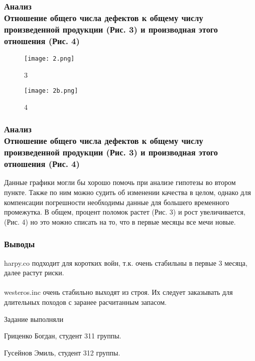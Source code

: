 \documentclass[8pt]{beamer}
\begin{document}
\begin{frame}
\frametitle{Анализ\\ {\small Отношение общего числа дефектов к общему числу произведенной продукции (Рис. 3) и производная этого отношения (Рис. 4)}}
\begin{figure}[h]
		\texttt{[image: 2.png]}
		\caption{3}
		\label{Third}
\end{figure}

\begin{figure}[h]
		\texttt{[image: 2b.png]}
		\caption{4}
		\label{Fourth}
\end{figure}

\end{frame}

\begin{frame}
\frametitle{Анализ\\ {\small Отношение общего числа дефектов к общему числу произведенной продукции (Рис. 3) и производная этого отношения (Рис. 4)}}
Данные графики могли бы хорошо помочь при анализе гипотезы во втором пункте. Также по ним можно судить об изменении качества в целом, однако для компенсации погрешности необходимы данные для большего временного промежутка. В общем, процент поломок растет (Рис. 3) и рост увеличивается, (Рис. 4) но это можно списать на то, что в первые месяцы все мечи новые.
\end{frame}


\begin{frame}
\frametitle{Выводы}
harpy.co подходит для коротких войн, т.к. очень стабильны в первые 3 месяца, \\далее растут риски.\\
~\\
westeros.inc очень стабильно выходят из строя. Их следует заказывать для длительных походов с заранее расчитанным запасом.
\end{frame}

\begin{frame}{Задание выполняли}
	\begin{itemize}
		{\small
		\item Гриценко Богдан, студент 311 группы.
		\item Гусейнов Эмиль, студент 312 группы.}
	\end{itemize}	

\end{frame}
\end{document}
